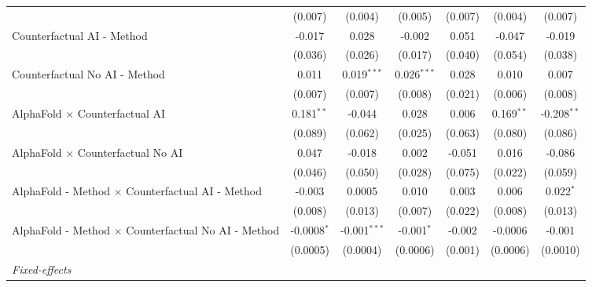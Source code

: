 \begin{tabular}{lcccccc}
                                                              & (0.007)       & (0.004)        & (0.005)       & (0.007)       & (0.004)       & (0.007)\\   
   Counterfactual AI - Method                                 & -0.017        & 0.028          & -0.002        & 0.051         & -0.047        & -0.019\\   
                                                              & (0.036)       & (0.026)        & (0.017)       & (0.040)       & (0.054)       & (0.038)\\   
   Counterfactual No AI - Method                              & 0.011         & 0.019$^{***}$  & 0.026$^{***}$ & 0.028         & 0.010         & 0.007\\   
                                                              & (0.007)       & (0.007)        & (0.008)       & (0.021)       & (0.006)       & (0.008)\\   
   AlphaFold $\times$ Counterfactual AI                       & 0.181$^{**}$  & -0.044         & 0.028         & 0.006         & 0.169$^{**}$  & -0.208$^{**}$\\   
                                                              & (0.089)       & (0.062)        & (0.025)       & (0.063)       & (0.080)       & (0.086)\\   
   AlphaFold $\times$ Counterfactual No AI                    & 0.047         & -0.018         & 0.002         & -0.051        & 0.016         & -0.086\\   
                                                              & (0.046)       & (0.050)        & (0.028)       & (0.075)       & (0.022)       & (0.059)\\   
   AlphaFold - Method $\times$ Counterfactual AI - Method     & -0.003        & 0.0005         & 0.010         & 0.003         & 0.006         & 0.022$^{*}$\\   
                                                              & (0.008)       & (0.013)        & (0.007)       & (0.022)       & (0.008)       & (0.013)\\   
   AlphaFold - Method $\times$ Counterfactual No AI - Method  & -0.0008$^{*}$ & -0.001$^{***}$ & -0.001$^{*}$  & -0.002        & -0.0006       & -0.001\\   
                                                              & (0.0005)      & (0.0004)       & (0.0006)      & (0.001)       & (0.0006)      & (0.0010)\\   
   \midrule
   \emph{Fixed-effects}\\

\end{tabular}
